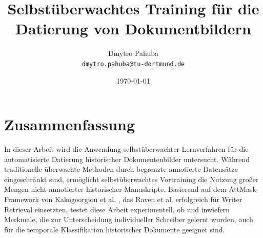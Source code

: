 \documentclass[12pt,a4paper]{article}
\title{\textbf{Selbstüberwachtes Training für die Datierung von Dokumentbildern}}
\author{Dmytro Pahuba\\
\texttt{dmytro.pahuba@tu-dortmund.de}}
\date{\germandate\today}
\begin{document}
\maketitle

\section*{\centering Zusammenfassung}

In dieser Arbeit wird die Anwendung selbstüberwachter Lernverfahren für die automatisierte Datierung historischer Dokumentenbilder untersucht. Während traditionelle überwachte Methoden durch begrenzte annotierte Datensätze eingeschränkt sind, ermöglicht selbstüberwachtes Vortraining die Nutzung großer Mengen nicht-annotierter historischer Manuskripte. Basierend auf dem AttMask-Framework von Kakogeorgiou et al. \cite{kakogeorgiou2022hide}, das Raven et al. \cite{raven2024self} erfolgreich für Writer Retrieval einsetzten, testet diese Arbeit experimentell, ob und inwiefern Merkmale, die zur Unterscheidung individueller Schreiber gelernt wurden, auch für die temporale Klassifikation historischer Dokumente geeignet sind.
\end{document}
